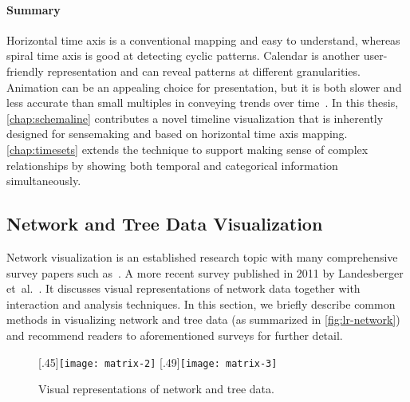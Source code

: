 \paragraph{Summary} Horizontal time axis is a conventional mapping and easy to understand, whereas spiral time axis is good at detecting cyclic patterns. Calendar is another user-friendly representation and can reveal patterns at different granularities. Animation can be an appealing choice for presentation, but it is both slower and less accurate than small multiples in conveying trends over time~\cite{Robertson2008}. In this thesis, \autoref{chap:schemaline} contributes a novel timeline visualization that is inherently designed for sensemaking and based on horizontal time axis mapping. \autoref{chap:timesets} extends the technique to support making sense of complex relationships by showing both temporal and categorical information simultaneously.

\subsection{Network and Tree Data Visualization}
Network visualization is an established research topic with many comprehensive survey papers such as~\cite{Herman2000}. A more recent survey published in 2011 by Landesberger et~al.~\cite{Landesberger2011}. It discusses visual representations of network data together with interaction and analysis techniques. In this section, we briefly describe common methods in visualizing network and tree data (as summarized in \autoref{fig:lr-network}) and recommend readers to aforementioned surveys for further detail.

\begin{figure}[t]
	\centering
	[.45\columnwidth]{\texttt{[image: matrix-2]}}
	\hfill
	[.49\columnwidth]{\texttt{[image: matrix-3]}}
	\\ \vspace{.5\baselineskip}
	\caption{Visual representations of network and tree data.}
	\label{fig:lr-network}
\end{figure}

